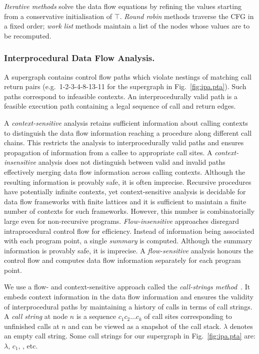 \documentclass{llncs}
\begin{document}
{\em Iterative methods\/} solve the data flow
equations by refining the values starting from a conservative
initialisation of $\top$. {\em Round robin\/} methods traverse the CFG
in a fixed order;
{\em work list\/} methods
maintain a list of the nodes whose values are to be recomputed.

\subsubsection{Interprocedural Data Flow Analysis.}
\label{sec:ipa.callstrings}
A supergraph contains control
flow paths which violate nestings of matching call return pairs (e.g.\
1-2-3-4-8-13-11 for the supergraph in Fig.~\ref{fig:ipa.pta}). Such
paths correspond to infeasible contexts. An interprocedurally valid path
is a feasible execution path containing a legal sequence of call and
return edges.


A {\em context-sensitive\/} analysis retains sufficient
information about calling contexts to distinguish the data flow
information reaching a procedure along different call chains. This
restricts the analysis to interprocedurally valid paths and 
ensures propagation of information from a callee to
appropriate call sites.
A {\em context-insensitive\/} analysis
does not distinguish between valid and invalid paths 
effectively merging data flow
information across calling contexts. Although the resulting information
is provably safe, it is often imprecise. Recursive procedures have
potentially infinite contexts, yet context-sensitive analysis is decidable
for data flow frameworks with finite lattices and it is sufficient to
maintain a finite number of contexts for such frameworks. However, this
number is combinatorially large even for non-recursive programs.
{\em Flow-insensitive\/} approaches disregard intraprocedural control flow
for efficiency. Instead of information being associated with each
program point, a single {\em summary} is computed. Although the summary
information is provably safe, it is imprecise. A {\em flow-sensitive\/} analysis
honours the control flow and computes data flow information separately
for each program point.



We use a flow- and context-sensitive 
approach called the {\em call-strings method\/}~\cite{Sharir.M.Pnueli.A:1981:Two-Approaches-to,Khedker.U.Sanyal.A.Karkare.B:2009:Data-Flow-Analysis,Khedker.UP.Karkare.B:2008:Efficiency-Precision-Simplicity}. It embeds
context information in the data flow information and ensures the
validity of interprocedural paths by maintaining a history of calls in
terms of call strings. A {\em call string\/} at node $n$ is a sequence
$c_1c_2\ldots c_k$ of call sites corresponding to unfinished calls
at $n$ and can be viewed as a snapshot of the call stack. $\lambda$
denotes an empty call string. Some call strings for our supergraph
in Fig.~\ref{fig:ipa.pta} are: $\lambda$, $c_1$, \text{$c_1c_2$},
\text{$c_1c_2c_2$} etc.
\end{document}
